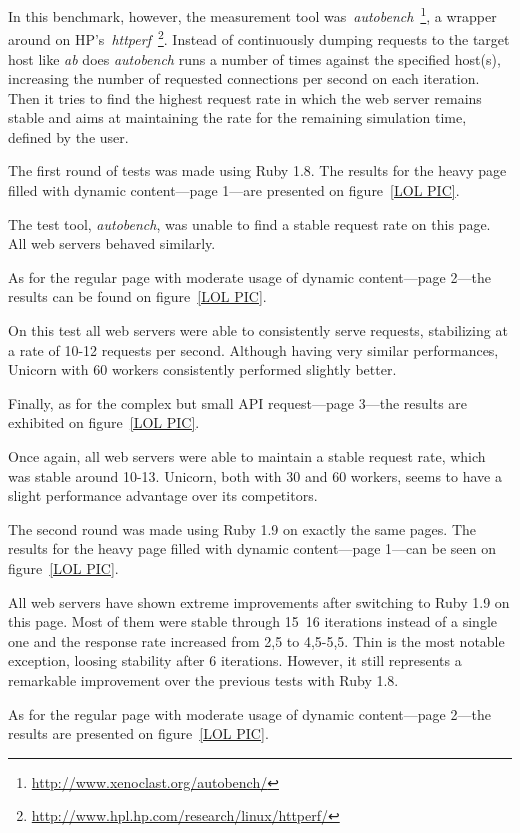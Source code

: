 In this benchmark, however, the measurement tool was~\textit{autobench}~\footnote{\url{http://www.xenoclast.org/autobench/}}, a wrapper around on HP's~\textit{httperf}~\footnote{\url{http://www.hpl.hp.com/research/linux/httperf/}}. Instead of continuously dumping requests to the target host like \textit{ab} does \textit{autobench} runs a number of times against the specified host(s), increasing the number of requested connections per second on each iteration. Then it tries to find the highest request rate in which the web server remains stable and aims at maintaining the rate for the remaining simulation time, defined by the user.

The first round of tests was made using Ruby 1.8. The results for the heavy page filled with dynamic content---page 1---are presented on figure~\ref{LOL PIC}.

The test tool, \textit{autobench}, was unable to find a stable request rate on this page. All web servers behaved similarly. 

As for the regular page with moderate usage of dynamic content---page 2---the results can be found on figure~\ref{LOL PIC}.

On this test all web servers were able to consistently serve requests, stabilizing at a rate of 10-12 requests per second. Although having very similar performances, Unicorn with 60 workers consistently performed slightly better. 

Finally, as for the complex but small API request---page 3---the results are exhibited on figure~\ref{LOL PIC}.

Once again, all web servers were able to maintain a stable request rate, which was stable around 10-13. Unicorn, both with 30 and 60 workers, seems to have a slight performance advantage over its competitors.

The second round was made using Ruby 1.9 on exactly the same pages. The results for the heavy page filled with dynamic content---page 1---can be seen on figure~\ref{LOL PIC}.

All web servers have shown extreme improvements after switching to Ruby 1.9 on this page. Most of them were stable through 15~16 iterations instead of a single one and the response rate increased from 2,5 to 4,5-5,5. Thin is the most notable exception, loosing stability after 6 iterations. However, it still represents a remarkable improvement over the previous tests with Ruby 1.8.

As for the regular page with moderate usage of dynamic content---page 2---the results are presented on figure~\ref{LOL PIC}.


